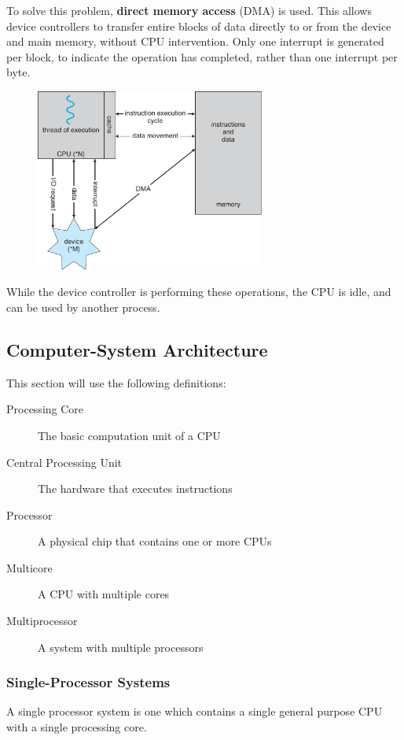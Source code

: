 \documentclass{article}
\begin{document}
To solve this problem, \textbf{direct memory access} (DMA) is used.
This allows device controllers to transfer entire blocks of data
directly to or from the device and main memory, without CPU
intervention. Only one interrupt is generated per block, to indicate
the operation has completed, rather than one interrupt per byte.
\begin{figure}[H]
    \centering
    \includegraphics[height = 6cm]{figures/dma.pdf}
\end{figure}
While the device controller is performing these operations, the CPU is
idle, and can be used by another process.
\subsection{Computer-System Architecture}
\begin{tcolorboxlarge}[title={Definitions}, parbox=false]
    This section will use the following definitions:
    \begin{description}
        \item[Processing Core] The basic computation unit of a CPU
        \item[Central Processing Unit] The hardware that executes
              instructions
        \item[Processor] A physical chip that contains one or more CPUs
        \item[Multicore] A CPU with multiple cores
        \item[Multiprocessor] A system with multiple processors
    \end{description}
\end{tcolorboxlarge}
\subsubsection{Single-Processor Systems}
A single processor system is one which contains a single general
purpose CPU with a single processing core.
\end{document}
